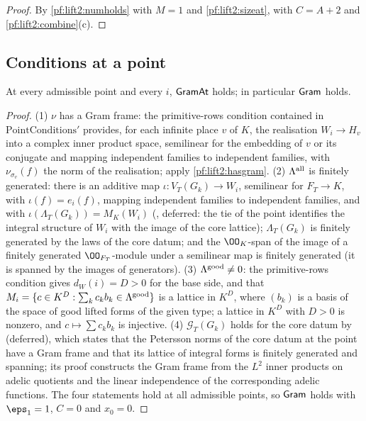 \begin{proof}
By \cref{pf:lift2:numholds} with $M=1$ and \cref{pf:lift2:sizeat}, with $C=A+2$ and \cref{pf:lift2:combine}(c).
\end{proof}

\subsection{Conditions at a point}\label{sec:pf:lift2:point}

\begin{proposition}\label{pf:lift2:gram}
At every admissible point and every $i$, $\mathsf{GramAt}$ holds; in particular $\mathsf{Gram}$ holds.
\end{proposition}

\begin{proof}
(1) $\nu$ has a Gram frame: the primitive-rows condition contained in $\mathrm{PointConditions}'$ provides, for each
infinite place $v$ of $K$, the realisation $W_i\to H_v$ into a complex inner product space, semilinear for the
embedding of $v$ or its conjugate and mapping independent families to independent families, with
$\nu_{\sigma_v}(f)$ the norm of the realisation; apply \cref{pf:lift2:hasgram}.
(2) $\Lambda^{\mathrm{all}}$ is finitely generated: there is an additive map $\iota\colon V_T(G_k)\to W_i$, semilinear for
$F_T\to K$, with $\iota(f)=e_i(f)$, mapping independent families to independent families, and with
$\iota(\Lambda_T(G_k))=M_K(W_i)$ (,
deferred: the tie of the point identifies the integral structure of $W_i$ with the image of the core lattice);
$\Lambda_T(G_k)$ is finitely generated by the laws of the core datum; and the $\OO_K$-span of the image of a finitely
generated $\OO_{F_T}$-module under a semilinear map is finitely generated (it is spanned by the images of
generators).
(3) $\Lambda^{\mathrm{good}}\ne0$: the primitive-rows condition gives $d_W(i)=D>0$ for the base side, and that
$M_i=\{c\in K^{D}:\sum_kc_kb_k\in\Lambda^{\mathrm{good}}\}$ is a lattice in $K^D$, where $(b_k)$ is a basis of the space
of good lifted forms of the given type; a lattice in $K^D$ with $D>0$ is nonzero, and $c\mapsto\sum c_kb_k$ is
injective.
(4) $\mathcal G_T(G_k)$ holds for the core datum by
 (deferred), which states that the Petersson norms
of the core datum at the point have a Gram frame and that its lattice of integral forms is finitely generated and
spanning; its proof constructs the Gram frame from the $L^2$ inner products on adelic quotients and the linear
independence of the corresponding adelic functions. The four statements hold at all admissible points, so
$\mathsf{Gram}$ holds with $\eps_1=1$, $C=0$ and $x_0=0$.
\end{proof}

